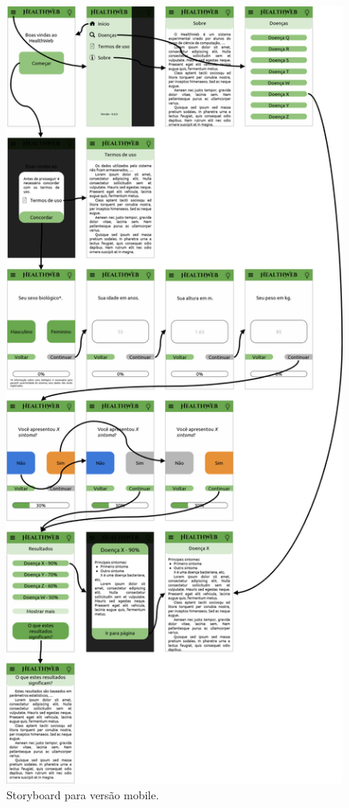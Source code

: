 \begin{figure}[h]
	\centering
	\includegraphics[height=\textheight]{figure/prototype/mobile/storyboard.png}
	\caption{Storyboard para versão mobile.}
	\label{fig:logomarca}
\end{figure}

